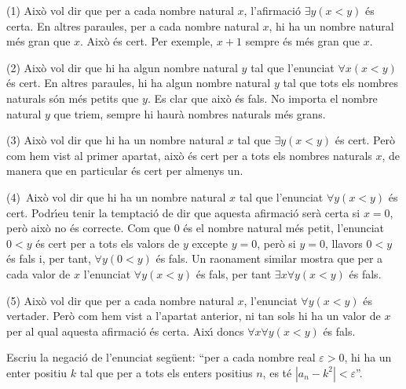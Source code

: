 \begin{solucio}
(1) Aix\`{o} vol dir que per a cada nombre natural $x$, l'afirmaci\'{o}
$\exists y(x<y)$ \'{e}s certa. En altres paraules, per a cada nombre natural
$x$, hi ha un nombre natural m\'{e}s gran que $x$. Aix\`{o} \'{e}s cert. Per
exemple, $x+1$ sempre \'{e}s m\'{e}s gran que $x$.

(2) Aix\`{o} vol dir que hi ha algun nombre natural $y$ tal que l'enunciat
$\forall x(x<y)$ \'{e}s cert. En altres paraules, hi ha algun nombre natural
$y$ tal que tots els nombres naturals s\'{o}n m\'{e}s petits que $y$. Es clar
que aix\`{o} \'{e}s fals. No importa el nombre natural $y$ que triem, sempre
hi haur\`{a} nombres naturals m\'{e}s grans.

(3) Aix\`{o} vol dir que hi ha un nombre natural $x$ tal que $\exists y(x<y)$
\'{e}s cert. Per\`{o} com hem vist al primer apartat, aix\`{o} \'{e}s cert per
a tots els nombres naturals $x$, de manera que en particular \'{e}s cert per
almenys un.

(4)\ Aix\`{o} vol dir que hi ha un nombre natural $x$ tal que l'enunciat
$\forall y(x<y)$ \'{e}s cert. Podr\'{\i}eu tenir la temptaci\'{o} de dir que
aquesta afirmaci\'{o} ser\`{a} certa si $x=0$, per\`{o} aix\`{o} no \'{e}s
correcte. Com que $0$ \'{e}s el nombre natural m\'{e}s petit, l'enunciat $0<y
$ \'{e}s cert per a tots els valors de $y$ excepte $y=0$, per\`{o} si $y=0$,
llavors $0<y$ \'{e}s fals i, per tant, $\forall y(0<y)$ \'{e}s fals. Un
raonament similar mostra que per a cada valor de $x$ l'enunciat $\forall
y(x<y)$ \'{e}s fals, per tant $\exists x\forall y(x<y)$ \'{e}s fals.

(5) Aix\`{o} vol dir que per a cada nombre natural $x$, l'enunciat $\forall
y(x<y)$ \'{e}s vertader. Per\`{o} com hem vist a l'apartat anterior, ni tan
sols hi ha un valor de $x$ per al qual aquesta afirmaci\'{o} \'{e}s certa.
Aix\'{\i} doncs $\forall x\forall y(x<y)$ \'{e}s fals.
\end{solucio}

\begin{exer}
Escriu la negaci\'{o} de l'enunciat seg\"{u}ent: \textquotedblleft per a cada
nombre real $\varepsilon>0$, hi ha un enter positiu $k$ tal que per a tots els
enters positius $n$, es t\'{e} $\left\vert a_{n}-k^{2}\right\vert
<\varepsilon$\textquotedblright.
\end{exer}

